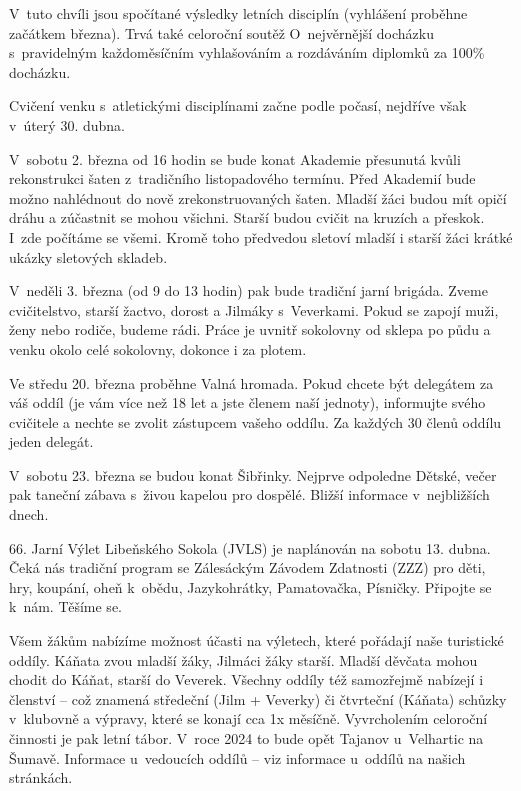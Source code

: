\documentclass[11pt]{article}
\begin{document}
V~tuto chvíli jsou spočítané výsledky letních disciplín (vyhlášení proběhne začátkem března). Trvá také celoroční soutěž O~nejvěrnější docházku s~pravidelným každoměsíčním vyhlašováním a rozdáváním diplomků za 100\% docházku. 

Cvičení venku s~atletickými disciplínami začne podle počasí, nejdříve však v~úterý 30. dubna.

V~sobotu 2. března od 16 hodin se bude konat Akademie přesunutá kvůli rekonstrukci šaten z~tradičního listopadového termínu. Před Akademií bude možno nahlédnout do nově zrekonstruovaných šaten. Mladší žáci budou mít opičí dráhu a zúčastnit se mohou všichni. Starší budou cvičit na kruzích a přeskok. I~zde počítáme se všemi. Kromě toho předvedou sletoví mladší i starší žáci krátké ukázky sletových skladeb.

V~neděli 3. března (od 9 do 13 hodin) pak bude tradiční jarní brigáda. Zveme cvičitelstvo, starší žactvo, dorost a Jilmáky s~Veverkami. Pokud se zapojí muži, ženy nebo rodiče, budeme rádi. Práce je uvnitř sokolovny od sklepa po půdu a venku okolo celé sokolovny, dokonce i za plotem.

Ve středu 20. března proběhne Valná hromada. Pokud chcete být delegátem za váš oddíl (je vám více než 18 let a jste členem naší jednoty), informujte svého cvičitele a nechte se zvolit zástupcem vašeho oddílu. Za každých 30 členů oddílu jeden delegát.

V~sobotu 23. března se budou konat Šibřinky. Nejprve odpoledne Dětské, večer pak taneční zábava s~živou kapelou pro dospělé. Bližší informace v~nejbližších dnech.


66. Jarní Výlet Libeňského Sokola (JVLS) je naplánován na sobotu 13. dubna. Čeká nás tradiční program se Zálesáckým Závodem Zdatnosti (ZZZ) pro děti, hry, koupání, oheň k~obědu, Jazykohrátky, Pamatovačka, Písničky. Připojte se k~nám. Těšíme se.

Všem žákům nabízíme možnost účasti na výletech, které pořádají naše turistické oddíly. Káňata zvou mladší žáky, Jilmáci žáky starší. Mladší děvčata mohou chodit do Káňat, starší do Veverek. Všechny oddíly též samozřejmě nabízejí i členství – což znamená středeční (Jilm + Veverky) či čtvrteční (Káňata) schůzky v~klubovně a výpravy, které se konají cca 1x měsíčně. Vyvrcholením celoroční činnosti je pak letní tábor. V~roce 2024 to bude opět Tajanov u~Velhartic na Šumavě. Informace u~vedoucích oddílů – viz informace u~oddílů na našich stránkách. 
\end{document}
